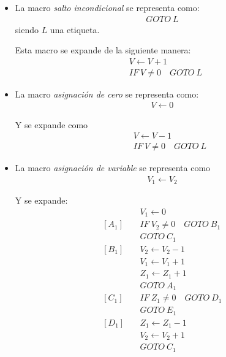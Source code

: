 \begin{itemize}
    \item La macro \textit{salto incondicional} se representa como:
        \begin{gather*}
            GOTO ~ L
        \end{gather*}
        siendo $L$ una etiqueta.

        Esta macro se expande de la siguiente manera:
        \begin{align*}
            &V \gets V + 1 \\
            &IF ~ V \neq 0 \quad GOTO ~ L
        \end{align*}

    \item La macro \textit{asignación de cero} se representa como:
        \begin{gather*}
            V \gets 0
        \end{gather*}

        Y se expande como
        \begin{align*}
            [L] \quad &V \gets V - 1 \\
                      &IF ~ V \neq 0 \quad GOTO ~ L
        \end{align*}

    \item La macro \textit{asignación de variable} se representa como
        \begin{gather*}
            V_1 \gets V_2
        \end{gather*}

        Y se expande:
        \begin{align*}
                        &V_1 \gets 0 \\
            [A_1] \quad &IF ~ V_2 \neq 0 \quad GOTO ~ B_1 \\
                        &GOTO ~ C_1 \\
            [B_1] \quad &V_2 \gets V_2 -1 \\
                        &V_1 \gets V_1 + 1 \\
                        &Z_1 \gets Z_1 + 1 \\
                        &GOTO ~ A_1 \\
            [C_1] \quad &IF ~ Z_1 \neq 0 \quad GOTO ~ D_1 \\
                        &GOTO ~ E_1 \\
            [D_1] \quad &Z_1 \gets Z_1 - 1 \\
                        &V_2 \gets V_2 + 1 \\
                        &GOTO ~ C_1
        \end{align*}


\end{itemize}
